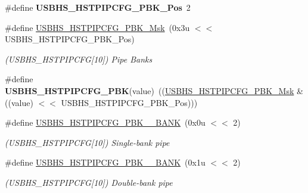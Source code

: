 \begin{DoxyCompactItemize}
\#define {\bfseries U\+S\+B\+H\+S\+\_\+\+H\+S\+T\+P\+I\+P\+C\+F\+G\+\_\+\+P\+B\+K\+\_\+\+Pos}~2
\item 
\mbox{\label{group__SAMV71__USBHS_ga9103cf0af08386de3cd07a457839e812}} 
\#define \mbox{\hyperlink{group__SAMV71__USBHS_ga9103cf0af08386de3cd07a457839e812}{U\+S\+B\+H\+S\+\_\+\+H\+S\+T\+P\+I\+P\+C\+F\+G\+\_\+\+P\+B\+K\+\_\+\+Msk}}~(0x3u $<$$<$ U\+S\+B\+H\+S\+\_\+\+H\+S\+T\+P\+I\+P\+C\+F\+G\+\_\+\+P\+B\+K\+\_\+\+Pos)
\begin{DoxyCompactList}\small\item\em (U\+S\+B\+H\+S\+\_\+\+H\+S\+T\+P\+I\+P\+C\+FG\mbox{[}10\mbox{]}) Pipe Banks \end{DoxyCompactList}\item 
\mbox{\label{group__SAMV71__USBHS_ga31f4600714971180d93ba18a7830f5a7}} 
\#define {\bfseries U\+S\+B\+H\+S\+\_\+\+H\+S\+T\+P\+I\+P\+C\+F\+G\+\_\+\+P\+BK}(value)~((\mbox{\hyperlink{group__SAMV71__USBHS_ga9103cf0af08386de3cd07a457839e812}{U\+S\+B\+H\+S\+\_\+\+H\+S\+T\+P\+I\+P\+C\+F\+G\+\_\+\+P\+B\+K\+\_\+\+Msk}} \& ((value) $<$$<$ U\+S\+B\+H\+S\+\_\+\+H\+S\+T\+P\+I\+P\+C\+F\+G\+\_\+\+P\+B\+K\+\_\+\+Pos)))
\item 
\mbox{\label{group__SAMV71__USBHS_gac865ef54672a64bc27455bb233edbd67}} 
\#define \mbox{\hyperlink{group__SAMV71__USBHS_gac865ef54672a64bc27455bb233edbd67}{U\+S\+B\+H\+S\+\_\+\+H\+S\+T\+P\+I\+P\+C\+F\+G\+\_\+\+P\+B\+K\+\_\+\_\+\+B\+A\+NK}}~(0x0u $<$$<$ 2)
\begin{DoxyCompactList}\small\item\em (U\+S\+B\+H\+S\+\_\+\+H\+S\+T\+P\+I\+P\+C\+FG\mbox{[}10\mbox{]}) Single-\/bank pipe \end{DoxyCompactList}\item 
\mbox{\label{group__SAMV71__USBHS_ga5ea6cc1697500d492897379045f858c3}} 
\#define \mbox{\hyperlink{group__SAMV71__USBHS_ga5ea6cc1697500d492897379045f858c3}{U\+S\+B\+H\+S\+\_\+\+H\+S\+T\+P\+I\+P\+C\+F\+G\+\_\+\+P\+B\+K\+\_\+\_\+\+B\+A\+NK}}~(0x1u $<$$<$ 2)
\begin{DoxyCompactList}\small\item\em (U\+S\+B\+H\+S\+\_\+\+H\+S\+T\+P\+I\+P\+C\+FG\mbox{[}10\mbox{]}) Double-\/bank pipe \end{DoxyCompactList}\item 

\end{DoxyCompactItemize}
